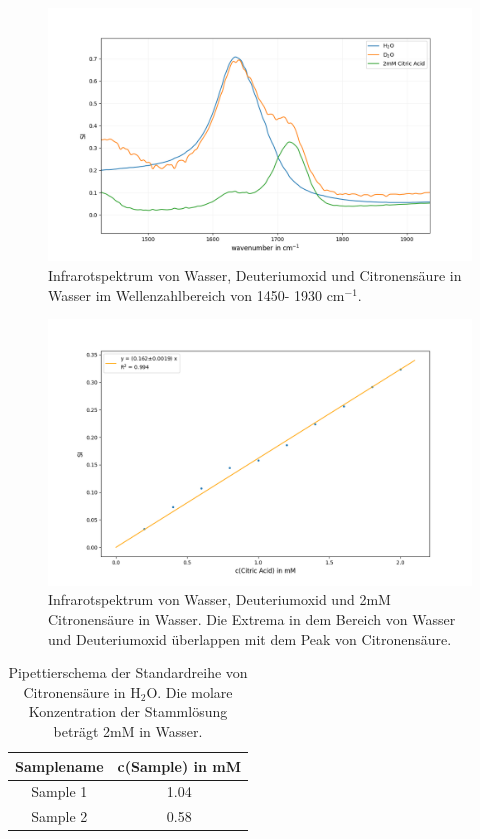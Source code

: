 \documentclass[10pt,a4paper]{article}
\begin{document}
		\begin{figure}[H]
			\centering
			\includegraphics[scale=0.65]{water_citricacid_upclose.png}
			\caption{Infrarotspektrum von Wasser, Deuteriumoxid und Citronensäure in Wasser im Wellenzahlbereich von 1450- 1930 cm$^{-1}$.}
			\label{fig:water_citricacid}
		\end{figure}
		
		\begin{figure}[H]
			\centering
			\includegraphics[scale=0.60]{Standardcurve_Fit.png}
			\caption{Infrarotspektrum von Wasser, Deuteriumoxid und 2mM Citronensäure in Wasser. Die Extrema in dem Bereich von Wasser und Deuteriumoxid überlappen mit dem Peak von Citronensäure.}
			\label{fig:Standardcurve}
		\end{figure}
	
		\begin{table}[H]
			\centering
			\caption{Pipettierschema der Standardreihe von Citronensäure in H$_2$O. Die molare Konzentration der Stammlösung beträgt 2mM in Wasser.}
			\label{tab:sampleconc}
			\begin{tabular}{cc}
				\toprule
				Samplename & c(Sample) in mM\\
				\midrule
				Sample 1 & 1.04\\
				Sample 2 & 0.58\\
				\bottomrule
			\end{tabular}
		\end{table}	
\end{document}
